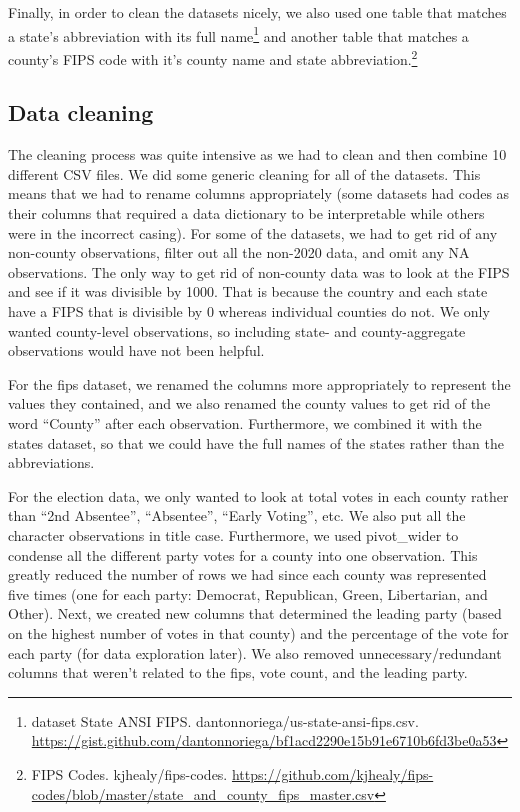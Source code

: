 \documentclass[
]{article}
\begin{document}
Finally, in order to clean the datasets nicely, we also used one table that matches a state's abbreviation with its full name\footnote{dataset State ANSI FIPS. dantonnoriega/us-state-ansi-fips.csv. \url{https://gist.github.com/dantonnoriega/bf1acd2290e15b91e6710b6fd3be0a53}} and another table that matches a county's FIPS code with it's county name and state abbreviation.\footnote{FIPS Codes. kjhealy/fips-codes. \url{https://github.com/kjhealy/fips-codes/blob/master/state_and_county_fips_master.csv}}

\hypertarget{data-cleaning}{%
\subsection{Data cleaning}\label{data-cleaning}}

The cleaning process was quite intensive as we had to clean and then combine 10 different CSV files. We did some generic cleaning for all of the datasets. This means that we had to rename columns appropriately (some datasets had codes as their columns that required a data dictionary to be interpretable while others were in the incorrect casing). For some of the datasets, we had to get rid of any non-county observations, filter out all the non-2020 data, and omit any NA observations. The only way to get rid of non-county data was to look at the FIPS and see if it was divisible by 1000. That is because the country and each state have a FIPS that is divisible by 0 whereas individual counties do not. We only wanted county-level observations, so including state- and county-aggregate observations would have not been helpful.

For the fips dataset, we renamed the columns more appropriately to represent the values they contained, and we also renamed the county values to get rid of the word ``County'' after each observation. Furthermore, we combined it with the states dataset, so that we could have the full names of the states rather than the abbreviations.

For the election data, we only wanted to look at total votes in each county rather than ``2nd Absentee'', ``Absentee'', ``Early Voting'', etc. We also put all the character observations in title case. Furthermore, we used pivot\_wider to condense all the different party votes for a county into one observation. This greatly reduced the number of rows we had since each county was represented five times (one for each party: Democrat, Republican, Green, Libertarian, and Other). Next, we created new columns that determined the leading party (based on the highest number of votes in that county) and the percentage of the vote for each party (for data exploration later). We also removed unnecessary/redundant columns that weren't related to the fips, vote count, and the leading party.
\end{document}
